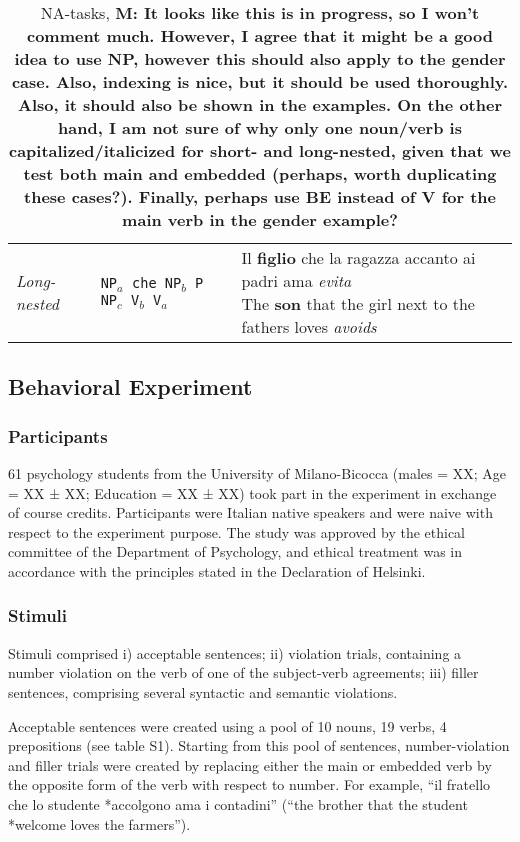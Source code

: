 \begin{table}
\begin{tabular}{lll}
\emph{Long-nested} & \texttt{NP$_a$ che NP$_b$ P NP$_c$ V$_b$ V$_a$} & \specialcell{Il \textbf{figlio} che la ragazza accanto ai padri ama \emph{evita}\vspace{-3mm}\\{\scriptsize The \textbf{son} that the girl next to the fathers loves \emph{avoids}}} \\
\end{tabular}
\caption{NA-tasks,  \textbf{M: It looks like this is in progress, so I won't comment much. However, I agree that it might be a good idea to use NP, however this should also apply to the gender case. Also, indexing is nice, but it should be used thoroughly. Also, it should also be shown in the examples. On the other hand, I am not sure of why only one noun/verb is capitalized/italicized for short- and long-nested, given that we test both main and embedded (perhaps, worth duplicating these cases?). Finally, perhaps use BE instead of V for the main verb in the gender example?}}
\end{table}

\subsection{Behavioral Experiment}
\subsubsection{Participants}
61 psychology students from the University of Milano-Bicocca (males = XX; Age = XX ± XX; Education = XX ± XX) took part in the experiment in exchange of course credits. Participants were Italian native speakers and were naive with respect to the experiment purpose. The study was approved by the ethical committee of the Department of Psychology, and ethical treatment was in accordance with the principles stated in the Declaration of Helsinki.

\subsubsection{Stimuli}
Stimuli comprised i) acceptable sentences; ii) violation trials, containing a number violation on the verb of one of the subject-verb agreements; iii) filler sentences, comprising several syntactic and semantic violations. 

Acceptable sentences were created using a pool of 10 nouns, 19 verbs, 4 prepositions (see table S1).
Starting from this pool of sentences, number-violation and filler trials were created by replacing either the main or embedded verb by the opposite form of the verb with respect to number. For example, ``il fratello che lo studente *accolgono ama i contadini'' (``the brother that the student *welcome loves the farmers'').

